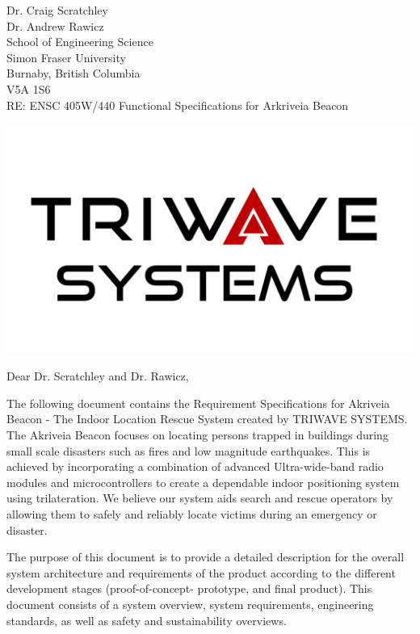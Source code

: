 \documentclass[11pt]{letter}
\date{June 09, 2019}
\begin{document}
\begin{letter}{
Dr. Craig Scratchley\\
Dr. Andrew Rawicz\\
School of Engineering Science\\
Simon Fraser University\\
Burnaby, British Columbia\\
V5A 1S6\\
\bigskip
RE: ENSC 405W/440 Functional Specifications for Arkriveia Beacon\\
}


\begin{center}
\includegraphics[scale=0.25]{./images/logo_W.png}
\end{center}


\opening{Dear Dr. Scratchley and Dr. Rawicz,}

\medskip
The following document contains the Requirement Specifications for Akriveia Beacon - The Indoor Location Rescue System created by TRIWAVE SYSTEMS. The Akriveia Beacon focuses on locating persons trapped in buildings during small scale disasters such as fires and low magnitude earthquakes. This is achieved by incorporating a combination of advanced Ultra-wide-band radio modules and microcontrollers to create a dependable indoor positioning system using trilateration. We believe our system aids search and rescue operators by allowing them to safely and reliably locate victims during an emergency or disaster.

\medskip
The purpose of this document is to provide a detailed description for the overall system architecture and requirements of the product according to the different development stages (proof-of-concept- prototype, and final product). This document consists of a system overview, system requirements, engineering standards, as well as safety and sustainability overviews.


\end{letter}
\end{document}

